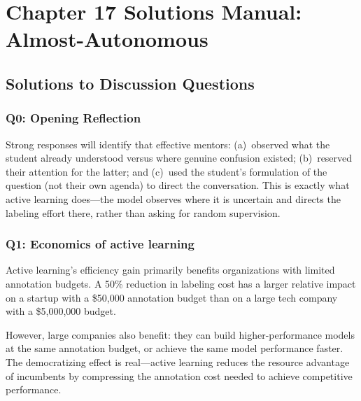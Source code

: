 
\section*{Chapter 17 Solutions Manual: Almost-Autonomous}

\subsection*{Solutions to Discussion Questions}

\subsubsection*{Q0: Opening Reflection}

Strong responses will identify that effective mentors: (a)~observed what the student already understood versus where genuine confusion existed; (b)~reserved their attention for the latter; and (c)~used the student's formulation of the question (not their own agenda) to direct the conversation. This is exactly what active learning does---the model observes where it is uncertain and directs the labeling effort there, rather than asking for random supervision.

\subsubsection*{Q1: Economics of active learning}

Active learning's efficiency gain primarily benefits organizations with limited annotation budgets. A 50\% reduction in labeling cost has a larger relative impact on a startup with a \$50,000 annotation budget than on a large tech company with a \$5,000,000 budget.

However, large companies also benefit: they can build higher-performance models at the same annotation budget, or achieve the same model performance faster. The democratizing effect is real---active learning reduces the resource advantage of incumbents by compressing the annotation cost needed to achieve competitive performance.

